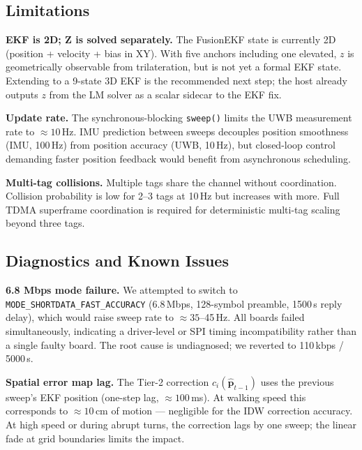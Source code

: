 
\subsection{Limitations}

\textbf{EKF is 2D; Z is solved separately.}
The FusionEKF state is currently 2D (position + velocity + bias in XY).
With five anchors including one elevated, $z$ is geometrically observable
from trilateration, but is not yet a formal EKF state.
Extending to a 9-state 3D EKF is the recommended next step; the host already
outputs $z$ from the LM solver as a scalar sidecar to the EKF fix.

\textbf{Update rate.}
The synchronous-blocking \texttt{sweep()} limits the UWB measurement rate
to $\approx10$\,Hz.
IMU prediction between sweeps decouples position smoothness (IMU, 100\,Hz)
from position accuracy (UWB, 10\,Hz), but closed-loop control demanding
faster position feedback would benefit from asynchronous scheduling.

\textbf{Multi-tag collisions.}
Multiple tags share the channel without coordination.
Collision probability is low for 2--3 tags at 10\,Hz but increases with more.
Full TDMA superframe coordination is required for deterministic multi-tag
scaling beyond three tags.

\subsection{Diagnostics and Known Issues}

\textbf{6.8 Mbps mode failure.}
We attempted to switch to \texttt{MODE\_SHORTDATA\_FAST\_ACCURACY}
(6.8\,Mbps, 128-symbol preamble, 1500\,\textmu s reply delay),
which would raise sweep rate to $\approx35$--45\,Hz.
All boards failed simultaneously, indicating a driver-level or SPI timing
incompatibility rather than a single faulty board.
The root cause is undiagnosed; we reverted to 110\,kbps / 5000\,\textmu s.

\textbf{Spatial error map lag.}
The Tier-2 correction $c_i(\hat{\mathbf{p}}_{t-1})$ uses the previous
sweep's EKF position (one-step lag, $\approx100$\,ms).
At walking speed this corresponds to $\approx10$\,cm of motion ---
negligible for the IDW correction accuracy.
At high speed or during abrupt turns, the correction lags by one sweep;
the linear fade at grid boundaries limits the impact.
